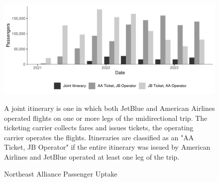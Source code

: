 \documentclass{article}
\begin{document}
    \begin{figure}
        \caption{Northeast Alliance Passenger Uptake}
        \label{fig:NEA_Uptake}
        \begin{center}
        \includegraphics[width = \linewidth]{05.Figures/NEA_OperationsGraph}
        \end{center}
        \vspace{-8mm}
        \footnotesize{A joint itinerary is one in which both JetBlue and American Airlines operated flights on one or more legs of the unidirectional trip. The ticketing carrier collects fares and issues tickets, the operating carrier operates the flights. Itineraries are classified as an "AA Ticket, JB Operator" if the entire itinerary was issued by American Airlines and JetBlue operated at least one leg of the trip.}
    \end{figure}
\end{document}
